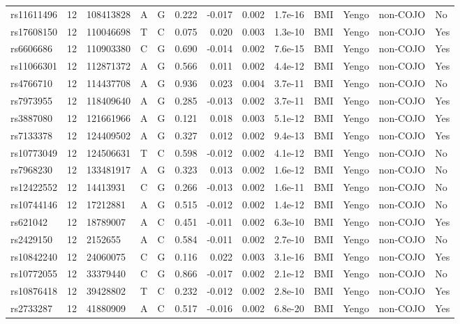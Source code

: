 \documentclass[11pt,twoside]{bristolthesis}
\begin{document}
\begin{longtable}[t]{lrlllrrrlllll}
rs11611496 & 12 & 108413828 & A & G & 0.222 & -0.017 & 0.002 & 1.7e-16 & BMI & Yengo & non-COJO & No\\
\addlinespace
rs17608150 & 12 & 110046698 & T & C & 0.075 & 0.020 & 0.003 & 1.3e-10 & BMI & Yengo & non-COJO & Yes\\
rs6606686 & 12 & 110903380 & C & G & 0.690 & -0.014 & 0.002 & 7.6e-15 & BMI & Yengo & non-COJO & Yes\\
rs11066301 & 12 & 112871372 & A & G & 0.566 & 0.011 & 0.002 & 4.4e-12 & BMI & Yengo & non-COJO & Yes\\
rs4766710 & 12 & 114437708 & A & G & 0.936 & 0.023 & 0.004 & 3.7e-11 & BMI & Yengo & non-COJO & No\\
rs7973955 & 12 & 118409640 & A & G & 0.285 & -0.013 & 0.002 & 3.7e-11 & BMI & Yengo & non-COJO & Yes\\
\addlinespace
rs3887080 & 12 & 121661966 & A & G & 0.121 & 0.018 & 0.003 & 5.1e-12 & BMI & Yengo & non-COJO & Yes\\
rs7133378 & 12 & 124409502 & A & G & 0.327 & 0.012 & 0.002 & 9.4e-13 & BMI & Yengo & non-COJO & Yes\\
rs10773049 & 12 & 124506631 & T & C & 0.598 & -0.012 & 0.002 & 4.1e-12 & BMI & Yengo & non-COJO & No\\
rs7968230 & 12 & 133481917 & A & G & 0.323 & 0.013 & 0.002 & 1.6e-12 & BMI & Yengo & non-COJO & No\\
rs12422552 & 12 & 14413931 & C & G & 0.266 & -0.013 & 0.002 & 1.6e-11 & BMI & Yengo & non-COJO & No\\
\addlinespace
rs10744146 & 12 & 17212881 & A & G & 0.515 & -0.012 & 0.002 & 1.4e-12 & BMI & Yengo & non-COJO & No\\
rs621042 & 12 & 18789007 & A & C & 0.451 & -0.011 & 0.002 & 6.3e-10 & BMI & Yengo & non-COJO & Yes\\
rs2429150 & 12 & 2152655 & A & C & 0.584 & -0.011 & 0.002 & 2.7e-10 & BMI & Yengo & non-COJO & No\\
rs10842240 & 12 & 24060075 & C & G & 0.116 & 0.022 & 0.003 & 3.1e-16 & BMI & Yengo & non-COJO & Yes\\
rs10772055 & 12 & 33379440 & C & G & 0.866 & -0.017 & 0.002 & 2.1e-12 & BMI & Yengo & non-COJO & No\\
\addlinespace
rs10876418 & 12 & 39428802 & T & C & 0.232 & -0.012 & 0.002 & 2.8e-10 & BMI & Yengo & non-COJO & Yes\\
rs2733287 & 12 & 41880909 & A & C & 0.517 & -0.016 & 0.002 & 6.8e-20 & BMI & Yengo & non-COJO & Yes\\

\end{longtable}
\end{document}
